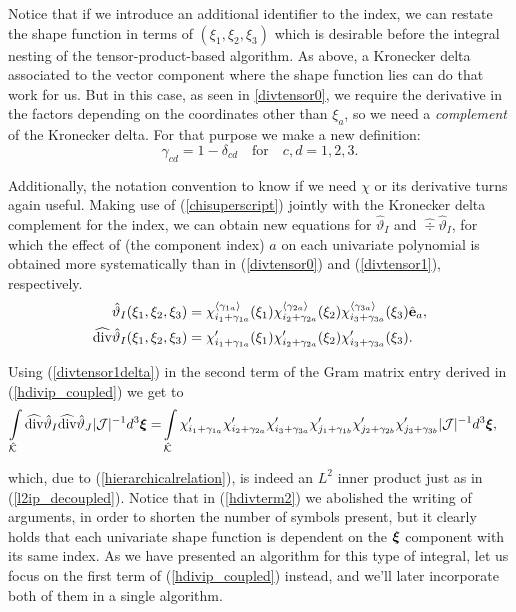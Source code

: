 Notice that if we introduce an additional identifier to the index, we can restate the shape function in terms of $(\xi_1,\xi_2,\xi_3)$ which is desirable before the integral nesting of the tensor-product-based algorithm. As above, a Kronecker delta associated to the vector component where the shape function lies can do that work for us. 
{\color{blue} But in this case, as seen in \eqref{divtensor0}, we require the derivative in the factors depending on the coordinates other than $\xi_a$, so we need a \emph{complement} of the Kronecker delta. For that purpose we make a new definition: 
\begin{equation*}
    \gamma_{cd}=1-\delta_{cd}\quad\text{for}\quad c,d=1,2,3.
\end{equation*}}

Additionally, the notation convention to know if we need $\chi$ or its derivative turns again useful. Making use of (\ref{chisuperscript}) jointly with the Kronecker delta complement for the index, we can obtain new equations for $\hat{\vartheta}_I$ and $\widehat{\div}\hat{\vartheta}_I$, for which the effect of (the component index) $a$ on each univariate polynomial is obtained more systematically than in (\ref{divtensor0}) and (\ref{divtensor1}), respectively. 
% 
\begin{align}
    \hat{\vartheta}_I(\xi_1,\xi_2,\xi_3)&= \chi_{i_1+\gamma_{1a}}^{\langle\gamma_{1a}\rangle}(\xi_1)\chi_{i_2+\gamma_{2a}}^{\langle\gamma_{2a}\rangle}(\xi_2) \chi_{i_3+\gamma_{3a}}^{\langle\gamma_{3a}\rangle}(\xi_3)\hat{\mathbf{e}}_a,\label{divtensor0delta}\\
    \widehat{\operatorname{div}}\hat{\vartheta}_I(\xi_1,\xi_2,\xi_3)&=\chi_{i_1+\gamma_{1a}}'(\xi_1)\chi_{i_2+\gamma_{2a}}'(\xi_2)\chi_{i_3+\gamma_{3a}}'(\xi_3). \label{divtensor1delta}
\end{align}

Using (\ref{divtensor1delta}) in the second term of the Gram matrix entry derived in (\ref{hdivip_coupled}) we get to
% 
\begin{align}
    \int\limits_{\hat{\mathcal{K}}}\widehat{\operatorname{div}}\hat{\vartheta}_I\widehat{\operatorname{div}}\hat{\vartheta}_J|\mathcal{J}|^{-1}d^3\boldsymbol{\xi}
    =&
        \int\limits_{\hat{\mathcal{K}}}\chi_{i_1+\gamma_{1a}}'\chi_{i_2+\gamma_{2a}}'\chi_{i_3+\gamma_{3a}}' \chi_{j_1+\gamma_{1b}}'\chi_{j_2+\gamma_{2b}}'\chi_{j_3+\gamma_{3b}}'|\mathcal{J}|^{-1}d^3\boldsymbol{\xi},
        \label{hdivterm2}
\end{align}

\noindent which, due to (\ref{hierarchicalrelation}), is indeed an $L^2$ inner product just as in (\ref{l2ip_decoupled}). Notice that in (\ref{hdivterm2}) we abolished the writing of arguments, in order to shorten the number of symbols present, but it clearly holds that each univariate shape function is dependent on the $\boldsymbol{\xi}$ component with its same index. As we have presented an algorithm for this type of integral, let us focus on the first term of (\ref{hdivip_coupled}) instead, and we'll later incorporate both of them in a single algorithm.

